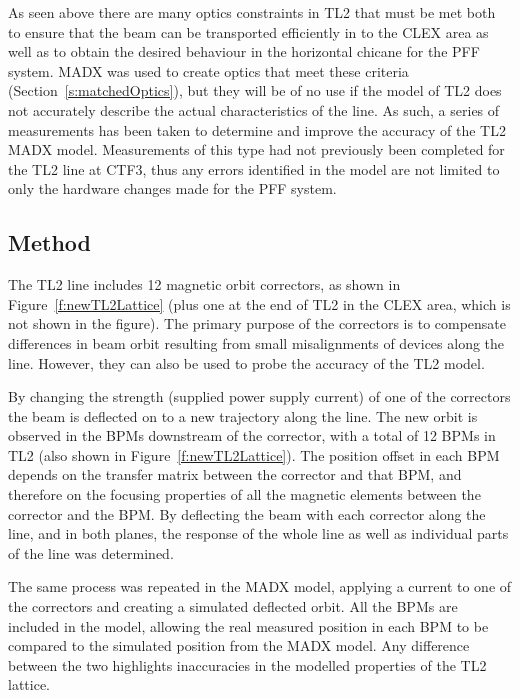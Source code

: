 
As seen above there are many optics constraints in TL2 that must be met both to ensure that the beam can be transported efficiently in to the CLEX area as well as to obtain the desired behaviour in the horizontal chicane for the PFF system. MADX was used to create optics that meet these criteria (Section~\ref{s:matchedOptics}), but they will be of no use if the model of TL2 does not accurately describe the actual characteristics of the line. As such, a series of measurements has been taken to determine and improve the accuracy of the TL2 MADX model. Measurements of this type had not previously been completed for the TL2 line at CTF3, thus any errors identified in the model are not limited to only the hardware changes made for the PFF system.

\subsection{Method}
\label{ss:opticsMethod}

The TL2 line includes 12 magnetic orbit correctors, as shown in Figure~\ref{f:newTL2Lattice} (plus one at the end of TL2 in the CLEX area, which is not shown in the figure). 
The primary purpose of the correctors is to compensate differences in beam orbit resulting from small misalignments of devices along the line. However, they can also be used to probe the accuracy of the TL2 model.

By changing the strength (supplied power supply current) of one of the correctors the beam is deflected on to a new trajectory along the line. The new orbit is observed in the BPMs downstream of the corrector, with a total of 12 BPMs in TL2 (also shown in Figure~\ref{f:newTL2Lattice}). The position offset in each BPM depends on the transfer matrix between the corrector and that BPM, and therefore on the focusing properties of all the magnetic elements between the corrector and the BPM. By deflecting the beam with each corrector along the line, and in both planes, the response of the whole line as well as individual parts of the line was determined.

The same process was repeated in the MADX model, applying a current to one of the correctors and creating a simulated deflected orbit. All the BPMs are included in the model, allowing the real measured position in each BPM to be compared to the simulated position from the MADX model. Any difference between the two highlights inaccuracies in the modelled properties of the TL2 lattice.

